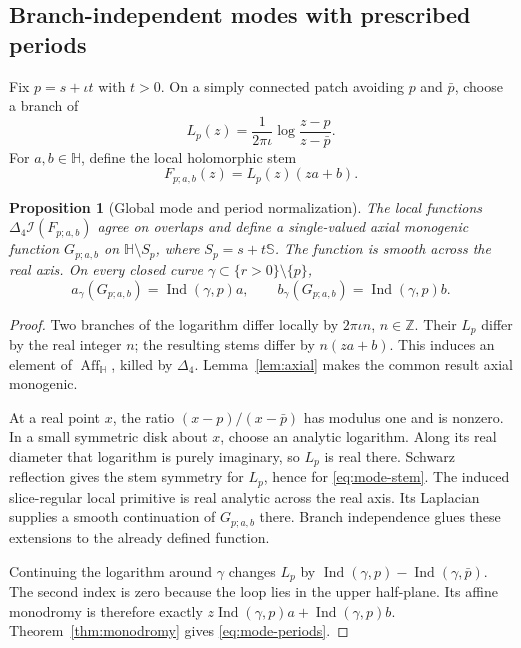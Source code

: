 \documentclass[11pt,a4paper]{article}
\numberwithin{equation}{section}
\newtheorem{proposition}[theorem]{Proposition}
\theoremstyle{definition}
\theoremstyle{remark}
\newcommand{\HH}{\mathbb H}
\newcommand{\SSS}{\mathbb S}
\newcommand{\Aff}{\operatorname{Aff}_{\HH}}
\newcommand{\Fu}{\Delta_4}
\newcommand{\Ind}{\operatorname{Ind}}
\begin{document}
\subsection{Branch-independent modes with prescribed periods}
Fix $p=s+\iota t$ with $t>0$. On a simply connected patch avoiding $p$ and
$\bar p$, choose a branch of
\begin{equation}
 L_p(z)=\frac1{2\pi\iota}\log\frac{z-p}{z-\bar p}.\label{eq:log-mode}
\end{equation}
For $a,b\in\HH$, define the local holomorphic stem
\begin{equation}
 F_{p;a,b}(z)=L_p(z)(za+b).\label{eq:mode-stem}
\end{equation}

\begin{proposition}[Global mode and period normalization]\label{prop:modes}
The local functions $\Fu\mathcal I(F_{p;a,b})$ agree on overlaps and define
a single-valued axial monogenic function $G_{p;a,b}$ on
$\HH\setminus S_p$, where $S_p=s+t\SSS$.
The function is smooth across the real axis. On every closed curve
$\gamma\subset\{r>0\}\setminus\{p\}$,
\begin{equation}
 a_\gamma(G_{p;a,b})=\Ind(\gamma,p)a,\qquad
 b_\gamma(G_{p;a,b})=\Ind(\gamma,p)b.\label{eq:mode-periods}
\end{equation}
\end{proposition}
\begin{proof}
Two branches of the logarithm differ locally by $2\pi\iota n$,
$n\in\mathbb Z$. Their $L_p$ differ by the real integer $n$; the resulting
stems differ by $n(za+b)$. This induces an element of $\Aff$, killed by
$\Fu$. Lemma~\ref{lem:axial} makes the common result axial monogenic.

At a real point $x$, the ratio $(x-p)/(x-\bar p)$ has modulus one and
is nonzero. In a small symmetric disk about $x$, choose an analytic
logarithm. Along its real diameter that logarithm is purely imaginary,
so $L_p$ is real there. Schwarz reflection gives the stem symmetry for
$L_p$, hence for \eqref{eq:mode-stem}. The induced slice-regular local
primitive is real analytic across the real axis. Its Laplacian supplies
a smooth continuation of $G_{p;a,b}$ there. Branch independence glues
these extensions to the already defined function.

Continuing the logarithm around $\gamma$ changes $L_p$ by
$\Ind(\gamma,p)-\Ind(\gamma,\bar p)$. The second index is zero because
the loop lies in the upper half-plane. Its affine monodromy is therefore
exactly $z\Ind(\gamma,p)a+\Ind(\gamma,p)b$.
Theorem~\ref{thm:monodromy} gives \eqref{eq:mode-periods}.
\end{proof}
\end{document}
